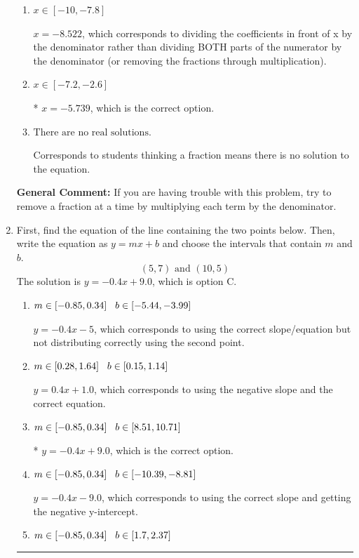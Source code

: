 \documentclass{extbook}[14pt]
\newcommand{\litem}[1]{\item #1

\rule{\textwidth}{0.4pt}}
\begin{document}
\begin{enumerate}
{\begin{enumerate}[label=\Alph*.]
 $x = 1.571$, which corresponds to dividing the second number in the numerator by the denominator rather than dividing BOTH parts of the numerator by the denominator (or removing the fractions through multiplication).
\item \( x \in [-10, -7.8] \)

 $x = -8.522$, which corresponds to dividing the coefficients in front of x by the denominator rather than dividing BOTH parts of the numerator by the denominator (or removing the fractions through multiplication).
\item \( x \in [-7.2, -2.6] \)

* $x = -5.739$, which is the correct option.
\item \( \text{There are no real solutions.} \)

Corresponds to students thinking a fraction means there is no solution to the equation.
\end{enumerate}

\textbf{General Comment:} If you are having trouble with this problem, try to remove a fraction at a time by multiplying each term by the denominator.
}
\litem{
First, find the equation of the line containing the two points below. Then, write the equation as $ y=mx+b $ and choose the intervals that contain $m$ and $b$.
\[ (5, 7) \text{ and } (10, 5) \]The solution is \( y = -0.4x + 9.0 \), which is option C.\begin{enumerate}[label=\Alph*.]
\item \( m \in [-0.85, 0.34] \hspace*{3mm} b \in [-5.44, -3.99] \)

 $y = -0.4x -5$, which corresponds to using the correct slope/equation but not distributing correctly using the second point.
\item \( m \in [0.28, 1.64] \hspace*{3mm} b \in [0.15, 1.14] \)

 $y = 0.4x + 1.0$, which corresponds to using the negative slope and the correct equation.
\item \( m \in [-0.85, 0.34] \hspace*{3mm} b \in [8.51, 10.71] \)

* $y = -0.4x + 9.0$, which is the correct option.
\item \( m \in [-0.85, 0.34] \hspace*{3mm} b \in [-10.39, -8.81] \)

 $y = -0.4x -9.0$, which corresponds to using the correct slope and getting the negative y-intercept.
\item \( m \in [-0.85, 0.34] \hspace*{3mm} b \in [1.7, 2.37] \)


\end{enumerate}}
\end{enumerate}
\end{document}
